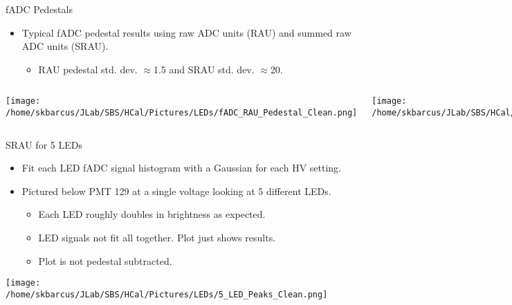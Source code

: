 \documentclass[10pt]{beamer}
\begin{document}
\begin{frame}{fADC Pedestals}

	\begin{itemize}
		\item Typical fADC pedestal results using raw ADC units (RAU) and summed raw ADC units (SRAU).
			\begin{itemize}
				\item[--] RAU pedestal std. dev. $\approx$1.5 and SRAU std. dev. $\approx$20.
			\end{itemize}
	\end{itemize}

	\begin{columns}[T,onlytextwidth]
	\begin{center}
		\texttt{[image: /home/skbarcus/JLab/SBS/HCal/Pictures/LEDs/fADC\_RAU\_Pedestal\_Clean.png]}
  	\end{center}
	
	\begin{center}
		\texttt{[image: /home/skbarcus/JLab/SBS/HCal/Pictures/LEDs/fADC\_SRAU\_Pedestal\_Clean.png]}
  	\end{center}
	
	\end{columns}

\end{frame}

\begin{frame}{SRAU for 5 LEDs}

	\begin{itemize}
		\item Fit each LED fADC signal histogram with a Gaussian for each HV setting.
		\item Pictured below PMT 129 at a single voltage looking at 5 different LEDs.
		\begin{itemize}
			\item[--] Each LED roughly doubles in brightness as expected.
			\item[--] LED signals not fit all together. Plot just shows results.
			\item[--] Plot is not pedestal subtracted.
		\end{itemize}
	\end{itemize}

	\begin{center}
		\texttt{[image: /home/skbarcus/JLab/SBS/HCal/Pictures/LEDs/5\_LED\_Peaks\_Clean.png]}
  	\end{center}

\end{frame}
\end{document}
